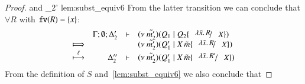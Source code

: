 \begin{proof}
%
	\noi and
%
	{\wb}
	{\Delta_2'}{}
	{lem:subst_equiv6}
%
%
%
	\noi From the latter transition we can conclude that $\forall R$ with $\mathtt{fv}(R) = \{x\}$:
%
	\[
		\begin{array}{crll}
			&\Gamma; \es; \Delta_2'& \proves & 
			\newsp{\tilde{m_2'}}{Q_1 \Par Q_2 \subst{\abs{\tilde{x}}{R}}{X}}\\
			\Hby{} & & &
			\newsp{\tilde{m_2'}}{Q_1' \Par \appl{X}{\tilde{m}} \subst{\abs{\tilde{x}}{R}}{X}} \\
			\hby{\ell}
			&\Delta_2''& \proves & \newsp{\tilde{m_2'}}{Q_1' \Par \appl{X}{\tilde{m}} \subst{\abs{\tilde{x}}{R'}}{X}}
		\end{array}
	\]
%
%
	\noi From the definition of $S$ and~\ref{lem:subst_equiv6}
	we also conclude that

\end{proof}
